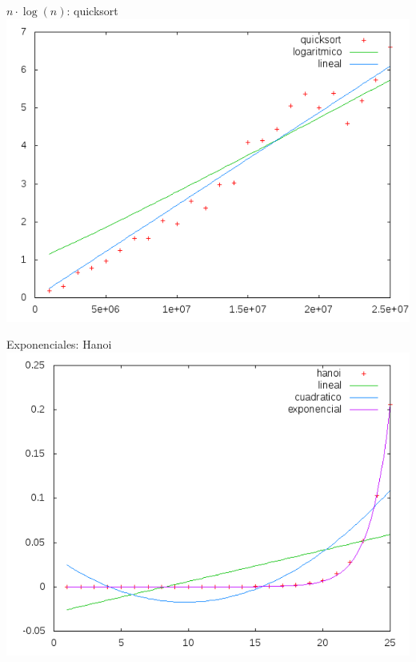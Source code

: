 \documentclass[10pt,compress,usetitleprogressbar,mathserif]{beamer}
\begin{document}
\begin{frame}{$n \cdot \log(n)$: quicksort}
	\includegraphics[width = \textwidth ]{img/log_hibrida.pdf}
\end{frame}

\begin{frame}{Exponenciales: Hanoi}
	\includegraphics[width = \textwidth ]{img/expo_hibrida2.pdf}
\end{frame}
\end{document}
